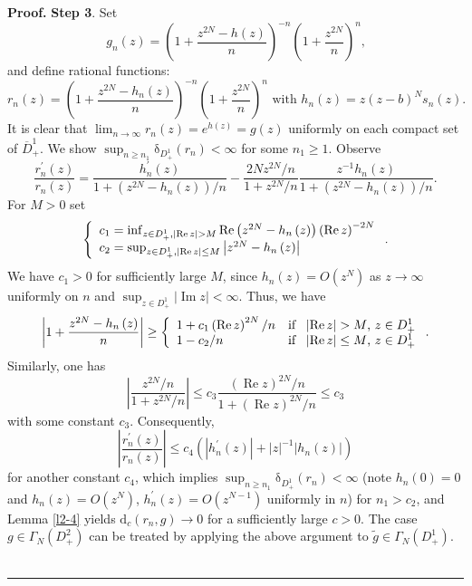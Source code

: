 \documentclass[a4paper]{article}%
\newenvironment{proof}[1][Proof]{\noindent\textbf{#1.} }{\ \rule{0.5em}{0.5em}}
\begin{document}
\begin{proof}
\textbf{Step 3}. Set
\[
g_{n}\left(  z\right)  =\left(  1+\dfrac{z^{2N}-h\left(  z\right)  }%
{n}\right)  ^{-n}\left(  1+\dfrac{z^{2N}}{n}\right)  ^{n}\text{,}%
\]
and define rational functions:%
\[
r_{n}\left(  z\right)  =\left(  1+\dfrac{z^{2N}-h_{n}\left(  z\right)  }%
{n}\right)  ^{-n}\left(  1+\dfrac{z^{2N}}{n}\right)  ^{n}\text{ with }%
h_{n}\left(  z\right)  =z\left(  z-b\right)  ^{N}s_{n}\left(  z\right)
\text{.}%
\]
It is clear that $\lim_{n\rightarrow\infty}r_{n}\left(  z\right)  =e^{h\left(
z\right)  }=g(z)$ uniformly on each compact set of $\overline{D}_{+}^{1}$. We
show $\sup_{n\geq n_{1}}\mathrm{\delta}_{D_{+}^{1}}\left(  r_{n}\right)
<\infty$ for some $n_{1}\geq1$. Observe%
\[
\dfrac{r_{n}^{\prime}\left(  z\right)  }{r_{n}\left(  z\right)  }=\dfrac
{h_{n}^{\prime}(z)}{1+\left(  z^{2N}-h_{n}\left(  z\right)  \right)
/n}-\dfrac{2Nz^{2N}/n}{1+z^{2N}/n}\dfrac{z^{-1}h_{n}\left(  z\right)
}{1+\left(  z^{2N}-h_{n}\left(  z\right)  \right)  /n}\text{.}%
\]
For $M>0$ set%
\[
\left\{
\begin{array}
[c]{l}%
c_{1}=\inf_{z\in D_{+}^{1},\left\vert \operatorname{Re}z\right\vert
>M}\operatorname{Re}\left(  z^{2N}-h_{n}\left(  z\right)  \right)  \left(
\operatorname{Re}z\right)  ^{-2N}\\
c_{2}=\sup_{z\in D_{+}^{1},\left\vert \operatorname{Re}z\right\vert \leq
M}\left\vert z^{2N}-h_{n}\left(  z\right)  \right\vert
\end{array}
\right.  \text{.}%
\]
We have $c_{1}>0$ for sufficiently large $M$, since $h_{n}\left(  z\right)
=O\left(  z^{N}\right)  $ as $z\rightarrow\infty$ uniformly on $n$ and
$\sup_{z\in D_{+}^{1}}\left\vert \operatorname{Im}z\right\vert <\infty$. Thus,
we have%
\[
\left\vert 1+\dfrac{z^{2N}-h_{n}\left(  z\right)  }{n}\right\vert \geq\left\{
%
\begin{array}
[c]{ll}%
1+c_{1}\left(  \operatorname{Re}z\right)  ^{2N}/n & \text{if \ }\left\vert
\operatorname{Re}z\right\vert >M\text{, }z\in D_{+}^{1}\\
1-c_{2}/n & \text{if \ }\left\vert \operatorname{Re}z\right\vert \leq M\text{,
}z\in D_{+}^{1}%
\end{array}
\right.  \text{.}%
\]
Similarly, one has%
\[
\left\vert \dfrac{z^{2N}/n}{1+z^{2N}/n}\right\vert \leq c_{3}\dfrac{\left(
\operatorname{Re}z\right)  ^{2N}/n}{1+\left(  \operatorname{Re}z\right)
^{2N}/n}\leq c_{3}%
\]
with some constant $c_{3}$. Consequently,%
\[
\left\vert \dfrac{r_{n}^{\prime}\left(  z\right)  }{r_{n}\left(  z\right)
}\right\vert \leq c_{4}\left(  \left\vert h_{n}^{\prime}(z)\right\vert
+\left\vert z\right\vert ^{-1}\left\vert h_{n}\left(  z\right)  \right\vert
\right)
\]
for another constant $c_{4}$, which implies $\sup_{n\geq n_{1}}\mathrm{\delta
}_{D_{+}^{1}}\left(  r_{n}\right)  <\infty$ (note $h_{n}(0)=0$ and
$h_{n}\left(  z\right)  =O\left(  z^{N}\right)  $, $h_{n}^{\prime}\left(
z\right)  =O\left(  z^{N-1}\right)  $ uniformly in $n$) for $n_{1}>c_{2}$, and
Lemma \ref{l2-4} yields $\mathrm{d}_{c}\left(  r_{n},g\right)  \rightarrow0$
for a sufficiently large $c>0$. The case $g\in\Gamma_{N}\left(  D_{+}%
^{2}\right)  $ can be treated by applying the above argument to $\widetilde
{g}\in\Gamma_{N}\left(  D_{+}^{1}\right)  $.\bigskip
\end{proof}
\end{document}

